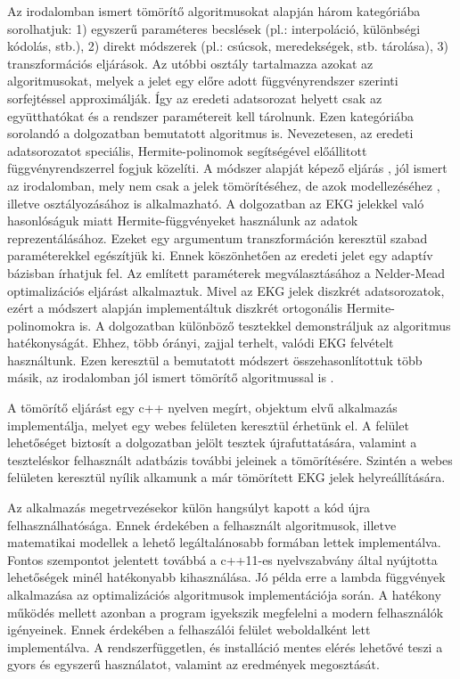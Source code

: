 \documentclass[oneside,titlepage,12pt,a4paper]{report}
\begin{document}
Az irodalomban ismert tömörítő algoritmusokat \cite{unifiedReview} alapján három kategóriába sorolhatjuk: 1) egyszerű paraméteres becslések (pl.: interpoláció, különbségi kódolás, stb.), 2) direkt módszerek (pl.: csúcsok, meredekségek, stb. tárolása), 3) transzformációs eljárások. Az utóbbi osztály tartalmazza azokat az algoritmusokat, melyek a jelet egy előre adott függvényrendszer szerinti sorfejtéssel approximálják. Így az eredeti adatsorozat helyett csak az együtthatókat és a rendszer paramétereit kell tárolnunk. Ezen kategóriába sorolandó a dolgozatban bemutatott algoritmus is. Nevezetesen, az eredeti adatsorozatot speciális, Hermite-polinomok segítségével előállitott függvényrendszerrel fogjuk közelíti. A módszer alapját képező eljárás \cite{hexp3}, jól ismert az irodalomban, mely nem csak a jelek tömörítéséhez, de azok modellezéséhez \cite{hexp2}, illetve osztályozásához \cite{hexp1, hexp4} is alkalmazható. A dolgozatban az EKG jelekkel való hasonlóságuk miatt Hermite-függvényeket használunk az adatok reprezentálásához. Ezeket egy argumentum transzformáción keresztül szabad paraméterekkel egészítjük ki. Ennek köszönhetően az eredeti jelet egy adaptív bázisban írhatjuk fel. Az említett paraméterek megválasztásához a Nelder-Mead optimalizációs eljárást alkalmaztuk. Mivel az EKG jelek diszkrét adatsorozatok, ezért a módszert \cite{hexp5} alapján implementáltuk diszkrét ortogonális Hermite-polinomokra is. A dolgozatban különböző tesztekkel demonstráljuk az algoritmus hatékonyságát. Ehhez, több órányi, zajjal terhelt, valódi EKG felvételt használtunk. Ezen keresztül a bemutatott módszert összehasonlítottuk több másik, az irodalomban jól ismert tömörítő algoritmussal is \cite{jpeg2000ECG}. 

A tömörítő eljárást egy c++ nyelven megírt, objektum elvű alkalmazás implementálja, melyet egy webes felületen keresztül érhetünk el. A felület lehetőséget biztosít a dolgozatban jelölt tesztek újrafuttatására, valamint a teszteléskor felhasznált adatbázis további jeleinek a tömörítésére. Szintén a webes felületen keresztül nyílik alkamunk a már tömörített EKG jelek helyreállítására. 

Az alkalmazás megetrvezésekor külön hangsúlyt kapott a kód újra felhasználhatósága. Ennek érdekében a felhasznált algoritmusok, illetve matematikai modellek a lehető legáltalánosabb formában lettek implementálva. Fontos szempontot jelentett továbbá a c++11-es nyelvszabvány által nyújtotta lehetőségek minél hatékonyabb kihasználása. Jó példa erre a lambda függvények alkalmazása az optimalizációs algoritmusok implementációja során. A hatékony működés mellett azonban a program igyekszik megfelelni a modern felhasználók igényeinek. Ennek érdekében a felhaszálói felület weboldalként lett implementálva. A rendszerfüggetlen, és installáció mentes elérés lehetővé teszi a gyors és egyszerű használatot, valamint az eredmények megosztását.  
\end{document}
